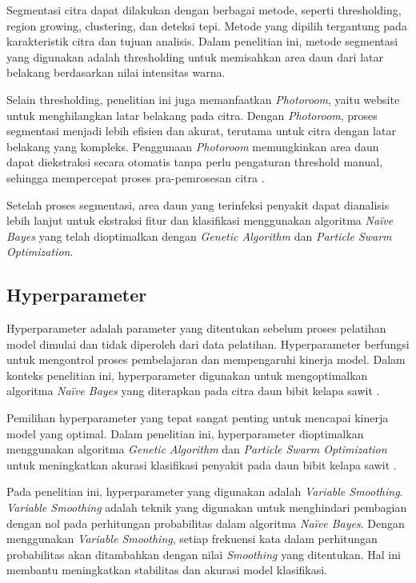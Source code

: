 Segmentasi citra dapat dilakukan dengan berbagai metode, seperti thresholding, region growing, clustering, dan deteksi tepi. Metode yang dipilih tergantung pada karakteristik citra dan tujuan analisis. Dalam penelitian ini, metode segmentasi yang digunakan adalah thresholding untuk memisahkan area daun dari latar belakang berdasarkan nilai intensitas warna.

Selain thresholding, penelitian ini juga memanfaatkan \textit{Photoroom}, yaitu website untuk menghilangkan latar belakang pada citra. Dengan \textit{Photoroom}, proses segmentasi menjadi lebih efisien dan akurat, terutama untuk citra dengan latar belakang yang kompleks. Penggunaan \textit{Photoroom} memungkinkan area daun dapat diekstraksi secara otomatis tanpa perlu pengaturan threshold manual, sehingga mempercepat proses pra-pemrosesan citra \cite{wijayaimplementasi}.

Setelah proses segmentasi, area daun yang terinfeksi penyakit dapat dianalisis lebih lanjut untuk ekstraksi fitur dan klasifikasi menggunakan algoritma \textit{Naïve Bayes} yang telah dioptimalkan dengan \textit{Genetic Algorithm} dan \textit{Particle Swarm Optimization}. 

\subsection{Hyperparameter} \label{II. Hyperparameter}
Hyperparameter adalah parameter yang ditentukan sebelum proses pelatihan model dimulai dan tidak diperoleh dari data pelatihan. Hyperparameter berfungsi untuk mengontrol proses pembelajaran dan mempengaruhi kinerja model. Dalam konteks penelitian ini, hyperparameter digunakan untuk mengoptimalkan algoritma \textit{Naïve Bayes} yang diterapkan pada citra daun bibit kelapa sawit \cite{burhanuddin2024klasifikasi}.

Pemilihan hyperparameter yang tepat sangat penting untuk mencapai kinerja model yang optimal. Dalam penelitian ini, hyperparameter dioptimalkan menggunakan algoritma \textit{Genetic Algorithm} dan \textit{Particle Swarm Optimization} untuk meningkatkan akurasi klasifikasi penyakit pada daun bibit kelapa sawit \cite{vratiwi2024penerapan}.

Pada penelitian ini, hyperparameter yang digunakan adalah \textit{Variable Smoothing}. \textit{Variable Smoothing} adalah teknik yang digunakan untuk menghindari pembagian dengan nol pada perhitungan probabilitas dalam algoritma \textit{Naïve Bayes}. Dengan menggunakan \textit{Variable Smoothing}, setiap frekuensi kata dalam perhitungan probabilitas akan ditambahkan dengan nilai \textit{Smoothing} yang ditentukan. Hal ini membantu meningkatkan stabilitas dan akurasi model klasifikasi. 

